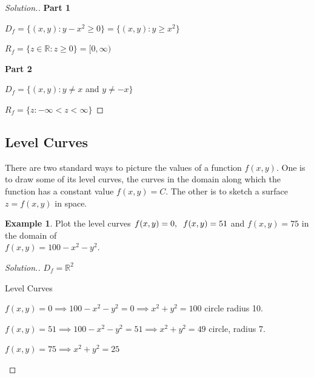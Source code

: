 \documentclass[11pt,a4paper]{article}
\theoremstyle{definition}
\newtheorem{exa}[thm]{Example}
\newenvironment{solution}
  {\renewcommand{\qedsymbol}{}\begin{proof}[\textit{Solution}.]}
  {\end{proof}}
\newcommand{\subhead}[1]{%
  \par\medskip\noindent\textbf{#1}\par\nobreak\smallskip}
\begin{document}
\begin{solution}
\subhead{Part 1}
$\displaystyle{D_f = \{(x,y): y - x^2\geq 0\} = \{(x,y) : y \geq x^2\}}$


\begin{figure}[H]
\centering
{}
\end{figure}

$R_f = \{z \in \mathbb{R}: z\geq 0 \} = [0,\infty)$

\subhead{Part 2}
$D_f = \{(x,y): y \neq x$ and $y\neq -x\}$

$R_f = \{z: -\infty < z < \infty \}$
\end{solution}

\subsection{Level Curves}
There are two standard ways to picture the values of a function $f(x,y)$. One is to draw some of its level curves, the curves in the domain along which the function has a constant value  $f(x,y) =C$. The other is to sketch a surface $z = f(x,y)$ in space.


\begin{exa}


Plot the level curves $f(x,y)= 0, \hspace{0.2cm} f(x,y) = 51$ and $f(x,y) = 75$ in the domain of\\ $f(x,y) = 100 - x^2 - y^2$.
\end{exa}


\begin{solution}


$D_f = \mathbb{R}^2$


Level Curves


$f(x,y) = 0 \implies 100- x^2 -y^2 = 0\implies x^2 + y^2 = 100$ circle radius 10.


$f(x,y) = 51 \implies 100 - x^2 - y^2 = 51\implies x^2 + y^2 = 49$ circle, radius 7.


$f(x,y) = 75\implies x^2 + y^2 = 25$


\begin{figure}[H]
\centering
{}
\end{figure}
\end{solution}
\end{document}
